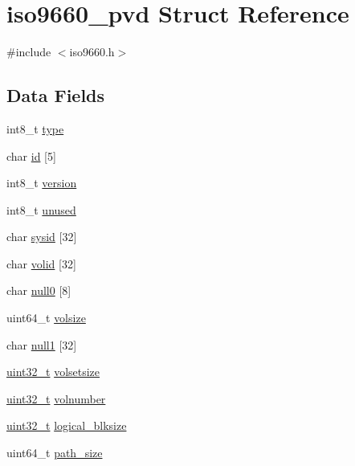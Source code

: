 \hypertarget{structiso9660__pvd}{\section{iso9660\+\_\+pvd Struct Reference}
\label{structiso9660__pvd}
}


{\ttfamily \#include $<$iso9660.\+h$>$}

\subsection*{Data Fields}
\begin{DoxyCompactItemize}
\item 
int8\+\_\+t \hyperlink{structiso9660__pvd_a6b7919d1112f6300190b5631fb043d05}{type}
\item 
char \hyperlink{structiso9660__pvd_a912fb8ad71f86bf868935349e74c540b}{id} \mbox{[}5\mbox{]}
\item 
int8\+\_\+t \hyperlink{structiso9660__pvd_ad4df80ddd241987b2e4ca9854fdb8780}{version}
\item 
int8\+\_\+t \hyperlink{structiso9660__pvd_a6c4091535d70ca1acc3b577223849988}{unused}
\item 
char \hyperlink{structiso9660__pvd_a51ac299b0235e32b6a2cfe79694af834}{sysid} \mbox{[}32\mbox{]}
\item 
char \hyperlink{structiso9660__pvd_a931f1452623da253d46c1fa9f8ce48e7}{volid} \mbox{[}32\mbox{]}
\item 
char \hyperlink{structiso9660__pvd_a78ee633ab6f48084aa516c057b174b2b}{null0} \mbox{[}8\mbox{]}
\item 
uint64\+\_\+t \hyperlink{structiso9660__pvd_a3fe7f0b32c84d626dfe47f2795e43b28}{volsize}
\item 
char \hyperlink{structiso9660__pvd_acd09bfa075780a123c973b0b0771f90e}{null1} \mbox{[}32\mbox{]}
\item 
\hyperlink{aplus_8h_a53a0df51603c77c2aa5b9ea61b606a82}{uint32\+\_\+t} \hyperlink{structiso9660__pvd_a16db75aa8abe67319ec68ef69b8a54a3}{volsetsize}
\item 
\hyperlink{aplus_8h_a53a0df51603c77c2aa5b9ea61b606a82}{uint32\+\_\+t} \hyperlink{structiso9660__pvd_a2f1450b3f7f1256e57962d92c495a0bd}{volnumber}
\item 
\hyperlink{aplus_8h_a53a0df51603c77c2aa5b9ea61b606a82}{uint32\+\_\+t} \hyperlink{structiso9660__pvd_a4f37c15dff0a03459e69a2bae00cb059}{logical\+\_\+blksize}
\item 
uint64\+\_\+t \hyperlink{structiso9660__pvd_a65e75027b09f31834cced9292f9b8525}{path\+\_\+size}

\end{DoxyCompactItemize}
